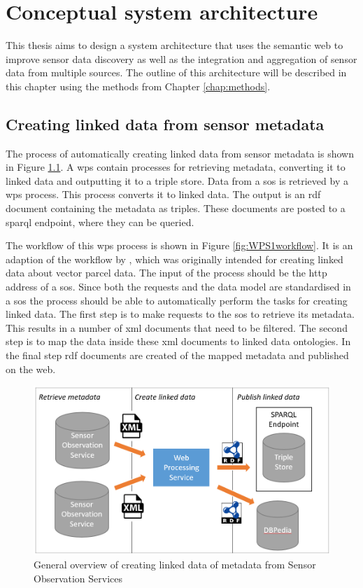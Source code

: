 

\chapter{Conceptual system architecture}
\label{chap:design}

This thesis aims to design a system architecture that uses the semantic web to improve sensor data discovery as well as the integration and aggregation of sensor data from multiple sources. The outline of this architecture will be described in this chapter using the methods from Chapter \ref{chap:methods}. 

\section{Creating linked data from sensor metadata}
\label{par:Architecture1}
The process of automatically creating linked data from sensor metadata is shown in Figure \ref{fig:WPS1}. A \ac{wps} contain processes for retrieving metadata, converting it to linked data and outputting it to a triple store. Data from a \ac{sos} is retrieved by a \ac{wps} process. This process converts it to linked data. The output is an \ac{rdf} document containing the metadata as triples. These documents are posted to a \ac{sparql} endpoint, where they can be queried.  

The workflow of this \ac{wps} process is shown in Figure \ref{fig:WPS1workflow}. It is an adaption of the workflow by \cite{LD:Missier}, which was originally intended for creating linked data about vector parcel data. The input of the process should be the \ac{http} address of a \ac{sos}. Since both the requests and the data model are standardised in a \ac{sos} the process should be able to automatically perform the tasks for creating linked data. The first step is to make requests to the \ac{sos} to retrieve its metadata. This results in a number of \ac{xml} documents that need to be filtered. The second step is to map the data inside these \ac{xml} documents to linked data ontologies. In the final step \ac{rdf} documents are created of the mapped metadata and published on the web.  

\begin{figure}
	\centering
	\includegraphics[width=0.8\linewidth]{UML/wps1diagram2.PNG}
	\caption{General overview of creating linked data of metadata from Sensor Observation Services}
	\label{fig:WPS1}
\end{figure}

